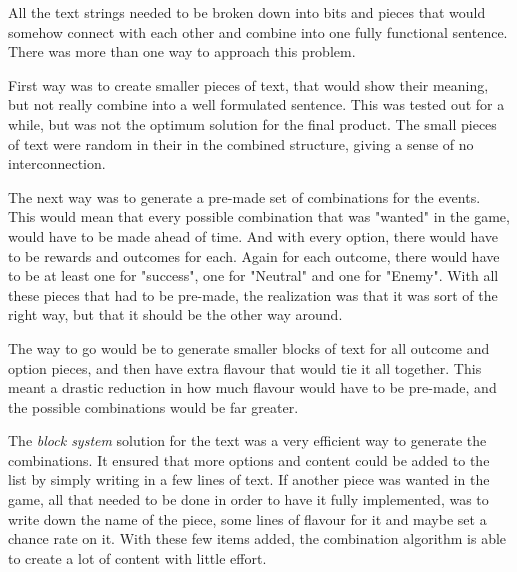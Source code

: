 All the text strings needed to be broken down into bits and pieces that would somehow connect with each other and combine into one fully functional sentence. 
There was more than one way to approach this problem.

First way was to create smaller pieces of text, that would show their meaning, but not really combine into a well formulated sentence. This was tested out for a while, but was not the optimum solution for the final product.
The small pieces of text were random in their in the combined structure, giving a sense of no interconnection.

The next way was to generate a pre-made set of combinations for the events. This would mean that every possible combination that was "wanted" in the game, would have to be made ahead of time. And with every option, there would have to be rewards and outcomes for each. Again for each outcome, there would have to be at least one for "success", one for "Neutral" and one for "Enemy". 
With all these pieces that had to be pre-made, the realization was that it was sort of the right way, but that it should be the other way around. 

The way to go would be to generate smaller blocks of text for all outcome and option pieces, and then have extra flavour that would tie it all together. This meant a drastic reduction in how much flavour would have to be pre-made, and the possible combinations would be far greater. 

The \textit{block system} solution for the text was a very efficient way to generate the combinations. It ensured that more options and content could be added to the list by simply writing in a few lines of text. If another piece was wanted in the game, all that needed to be done in order to have it fully implemented, was to write down the name of the piece, some lines of flavour for it and maybe set a chance rate on it. With these few items added, the combination algorithm is able to create a lot of content with little effort.

